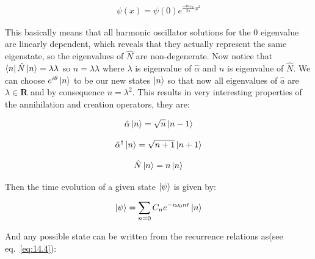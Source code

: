 \documentclass[
  journal=largetwo,
  year=2023,
]{cup-journal}
\begin{document}
\begin{equation}
  \begin{aligned}\label{eq:14.2}
    \psi(x) = \psi(0)e^{\frac{-m\omega_0}{2\pi}x^2}
  \end{aligned}
\end{equation}


This basically means that all harmonic oscillator solutions for the 0 eigenvalue are linearly dependent, which reveals that they actually represent the same eigenstate, so the eigenvalues of \(\hat{N}\) are non-degenerate. Now notice that \(\bra{n}\hat{N}\ket{n} = \lambda\lambda^{}\) so \(n = \lambda\lambda{}\) where \(\lambda\) is eigenvalue of \(\hat{\alpha}\) and \(n\) is eigenvalue of \(\hat{N}\). We can choose \(e^{i\theta}\ket{n}\) to be our new states \(\ket{n}\) so that now all eigenvalues of \(\hat{a}\) are \(\lambda \in \textbf{R}\) and by consequence \(n = \lambda^2\). This results in very interesting properties of the annihilation and creation operators, they are:

\begin{equation}
  \begin{aligned}\label{eq:14.3}
    \hat{\alpha}\ket{n} = \sqrt{n}\ket{n-1}
  \end{aligned}
\end{equation}

\begin{equation}
  \begin{aligned}\label{eq:14.4}
    \hat{\alpha}^{\dag}\ket{n} = \sqrt{n+1}\ket{n+1}
  \end{aligned}
\end{equation}

\begin{equation}
  \begin{aligned}\label{eq:14.5}
    \hat{N}\ket{n} = n\ket{n}
  \end{aligned}
\end{equation}

Then the time evolution of a given state \(\ket{\psi}\) is given by:

\begin{equation}
  \begin{aligned}\label{eq:14.6}
    \ket{\psi} = \sum_{n=0}{C_n e^{-i\omega_0nt}\ket{n}}
  \end{aligned}
\end{equation}

And any possible state can be written from the recurrence relations as(see eq.~\ref{eq:14.4}):
\end{document}
